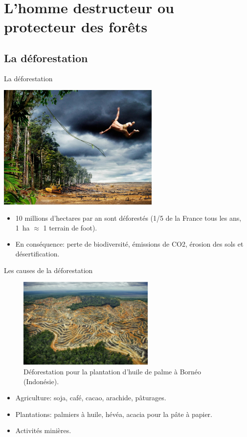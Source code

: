 \documentclass[10pt,table,dvipsnames,compress]{beamer}
\begin{document}
\section{L'homme destructeur ou protecteur des forêts}
\label{sec:org8277e15}

\subsection{La déforestation}
\label{sec:org3902729}

\begin{frame}[label={sec:orgd5370d3}]{La déforestation}
\begin{center}
\includegraphics[width=0.6\textwidth]{figs/tarzan.jpg}
\end{center}

\begin{itemize}
\item 10 millions d'hectares par an sont déforestés (1/5 de la France tous les ans, 1 ha \(\approx\) 1 terrain de foot).
\item En conséquence: perte de biodiversité, émissions de CO2, érosion des sols et désertification.
\end{itemize}
\end{frame}
\begin{frame}[label={sec:org68f836b}]{Les causes de la déforestation}
\begin{figure}[htbp]
\centering
\includegraphics[width=0.6\textwidth]{figs/plantations-huile-de-palme.jpg}
\caption{Déforestation pour la plantation d'huile de palme à Bornéo (Indonésie).}
\end{figure}

\begin{itemize}
\item Agriculture: soja, café, cacao, arachide, pâturages.
\item Plantations: palmiers à huile, hévéa, acacia pour la pâte à papier.
\item Activités minières.
\end{itemize}
\end{frame}
\end{document}
